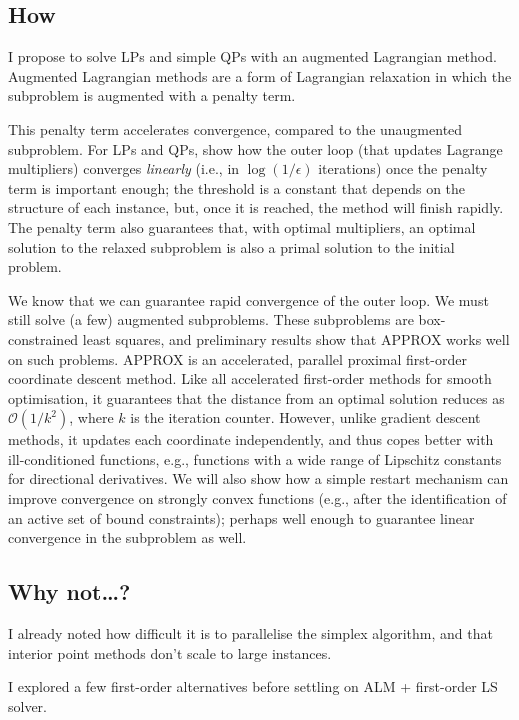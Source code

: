 \documentclass{article}
\begin{document}
\subsection{How}
I propose to solve LPs and simple QPs with an augmented Lagrangian
method.  Augmented Lagrangian methods are a form of Lagrangian
relaxation in which the subproblem is augmented with a penalty term.

This penalty term accelerates convergence, compared to the unaugmented
subproblem.  For LPs and QPs, \citep{Delbos:2005tg} show how the outer
loop (that updates Lagrange multipliers) converges \emph{linearly}
(i.e., in \(\log(1/\epsilon)\) iterations) once the penalty term is
important enough; the threshold is a constant that depends on the
structure of each instance, but, once it is reached, the method will
finish rapidly.  The penalty term also guarantees that, with optimal
multipliers, an optimal solution to the relaxed subproblem is also a
primal solution to the initial problem.

We know that we can guarantee rapid convergence of the outer loop.  We
must still solve (a few) augmented subproblems.  These subproblems are
box-constrained least squares, and preliminary results show that
APPROX \citep{Fercoq:2013wv} works well on such problems.  APPROX is
an accelerated, parallel proximal first-order coordinate descent
method.  Like all accelerated first-order methods for smooth
optimisation, it guarantees that the distance from an optimal solution
reduces as \(\mathcal{O}(1/k^2)\), where \(k\) is the iteration
counter.  However, unlike gradient descent methods, it updates each
coordinate independently, and thus copes better with ill-conditioned
functions, e.g., functions with a wide range of Lipschitz constants
for directional derivatives.  We will also show how a simple restart
mechanism \citep{ODonoghue:2012wca} can improve convergence on
strongly convex functions (e.g., after the identification of an active
set of bound constraints); perhaps well enough to guarantee linear
convergence in the subproblem as well.

\subsection{Why not\ldots?}
I already noted how difficult it is to parallelise the simplex
algorithm, and that interior point methods don't scale to large
instances.

I explored a few first-order alternatives before settling on ALM +
first-order LS solver.
\end{document}
